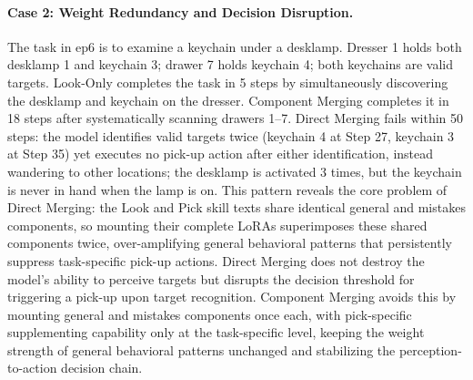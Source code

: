 \documentclass{llmxive}
\begin{document}
\paragraph{Case 2: Weight Redundancy and Decision Disruption.}
The task in ep6 is to examine a keychain under a desklamp. Dresser 1 holds both desklamp 1 and keychain 3; drawer 7 holds keychain 4; both keychains are valid targets. Look-Only completes the task in 5 steps by simultaneously discovering the desklamp and keychain on the dresser. Component Merging completes it in 18 steps after systematically scanning drawers 1--7. Direct Merging fails within 50 steps: the model identifies valid targets twice (keychain 4 at Step 27, keychain 3 at Step 35) yet executes no pick-up action after either identification, instead wandering to other locations; the desklamp is activated 3 times, but the keychain is never in hand when the lamp is on. This pattern reveals the core problem of Direct Merging: the Look and Pick skill texts share identical general and mistakes components, so mounting their complete LoRAs superimposes these shared components twice, over-amplifying general behavioral patterns that persistently suppress task-specific pick-up actions. Direct Merging does not destroy the model's ability to perceive targets but disrupts the decision threshold for triggering a pick-up upon target recognition. Component Merging avoids this by mounting general and mistakes components once each, with pick-specific supplementing capability only at the task-specific level, keeping the weight strength of general behavioral patterns unchanged and stabilizing the perception-to-action decision chain.
\end{document}
